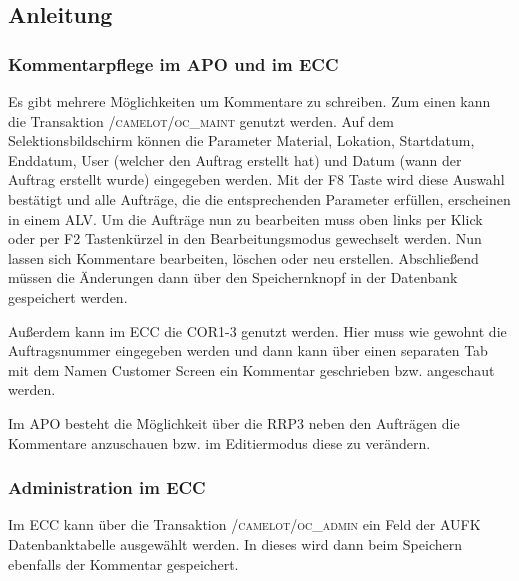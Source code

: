 \subsection{Anleitung}
\label{app:Anleitung}

\subsubsection{Kommentarpflege im APO und im ECC}
Es gibt mehrere Möglichkeiten um Kommentare zu schreiben.
Zum einen kann die Transaktion \textsc{/camelot/oc\_maint} genutzt werden. Auf dem Selektionsbildschirm können die Parameter Material, Lokation, Startdatum, Enddatum, User (welcher den Auftrag erstellt hat) und Datum (wann der Auftrag erstellt wurde) eingegeben werden. Mit der F8 Taste wird diese Auswahl bestätigt und alle Aufträge, die die entsprechenden Parameter erfüllen, erscheinen in einem \ac{ALV}. Um die Aufträge nun zu bearbeiten muss oben links per Klick oder per F2 Tastenkürzel in den Bearbeitungsmodus gewechselt werden. Nun lassen sich Kommentare bearbeiten, löschen oder neu erstellen. Abschließend müssen die Änderungen dann über den Speichernknopf in der Datenbank gespeichert werden.

Außerdem kann im ECC die COR1-3 genutzt werden. Hier muss wie gewohnt die Auftragsnummer eingegeben werden und dann kann über einen separaten Tab mit dem Namen Customer Screen ein Kommentar geschrieben bzw. angeschaut werden.

Im APO besteht die Möglichkeit über die RRP3 neben den Aufträgen die Kommentare anzuschauen bzw. im Editiermodus diese zu verändern.
 
\subsubsection{Administration im ECC}
Im ECC kann über die Transaktion \textsc{/camelot/oc\_admin} ein Feld der AUFK Datenbanktabelle ausgewählt werden. In dieses wird dann beim Speichern ebenfalls der Kommentar gespeichert.